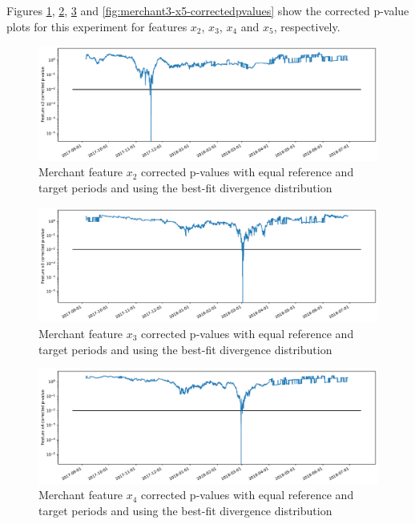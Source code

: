 Figures \ref{fig:merchant3-x2-correctedpvalues}, \ref{fig:merchant3-x3-correctedpvalues}, \ref{fig:merchant3-x4-correctedpvalues} and \ref{fig:merchant3-x5-correctedpvalues} show the corrected p-value plots for this experiment for features $x_2$, $x_3$, $x_4$ and $x_5$, respectively.
\begin{figure}[!htb]
    \begin{center}
      \includegraphics[scale=0.5]{figures/merchant3-x2-correctedpvalues.pdf}
      \caption{Merchant feature $x_2$ corrected p-values with equal reference and target periods and using the best-fit divergence distribution}
      \label{fig:merchant3-x2-correctedpvalues}
    \end{center}
\end{figure}
\begin{figure}[!htb]
    \begin{center}
      \includegraphics[scale=0.5]{figures/merchant3-x3-correctedpvalues.pdf}
      \caption{Merchant feature $x_3$ corrected p-values with equal reference and target periods and using the best-fit divergence distribution}
      \label{fig:merchant3-x3-correctedpvalues}
    \end{center}
\end{figure}
\begin{figure}[!htb]
    \begin{center}
      \includegraphics[scale=0.5]{figures/merchant3-x4-correctedpvalues.pdf}
      \caption{Merchant feature $x_4$ corrected p-values with equal reference and target periods and using the best-fit divergence distribution}
      \label{fig:merchant3-x4-correctedpvalues}
    \end{center}
\end{figure}
